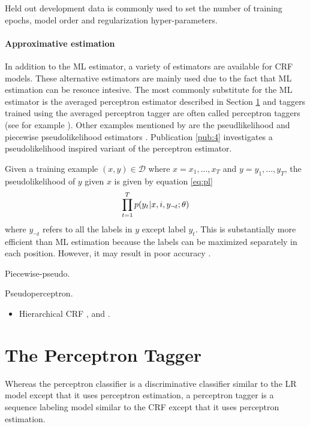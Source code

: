 Held out development data is commonly used to set the number of
training epochs, model order and regularization hyper-parameters.

\paragraph{Approximative estimation} In addition to the ML estimator,
a variety of estimators are available for CRF models. These
alternative estimators are mainly used due to the fact that ML
estimation can be resouce intesive. The most commonly substitute for
the ML estimator is the averaged perceptron estimator described in
Section \ref{sec:prec-tagger} and taggers trained using the averaged
perceptron tagger are often called perceptron taggers (see for example
\cite{Collins2002}). Other examples mentioned by \cite{Sutton2012} are
the pseudlikelihood \cite{Besag1975} and piecewise pseudolikelihood estimators
\cite{Sutton2007}. Publication \ref{pub:4} investigates a
pseudolikelihood inspired variant of the perceptron estimator.

Given a training example $(x,y) \in \mathcal{D}$ where $x = x_1, ..., x_T$ and $y = y_1, ..., y_T$, the pseudolikelihood of $y$ given $x$ is given by equation \ref{eq:pl}
\begin{equation}\label{pl}\prod_{t = 1}^T p(y_t | x, i, y_{\neg t} \mbox{$ ; \, $} \theta)\end{equation}
where $y_{\neg t}$ refers to all the labels in $y$ except label
$y_t$. This is substantially more efficient than ML estimation because
the labels can be maximized separately in each position. However, it
may result in poor accuracy \citep{someone}.

Piecewise-pseudo.

Pseudoperceptron.

\begin{itemize}
\item Hierarchical CRF \cite{Muller2013}, \cite{Weiss2010} and \cite{Charniak2005}.
\end{itemize}

\section{The Perceptron Tagger}
\label{sec:prec-tagger}

Whereas the perceptron classifier is a discriminative classifier
similar to the LR model except that it uses perceptron estimation, a
perceptron tagger \citep{Collins2002} is a sequence labeling model
similar to the CRF except that it uses perceptron estimation.

